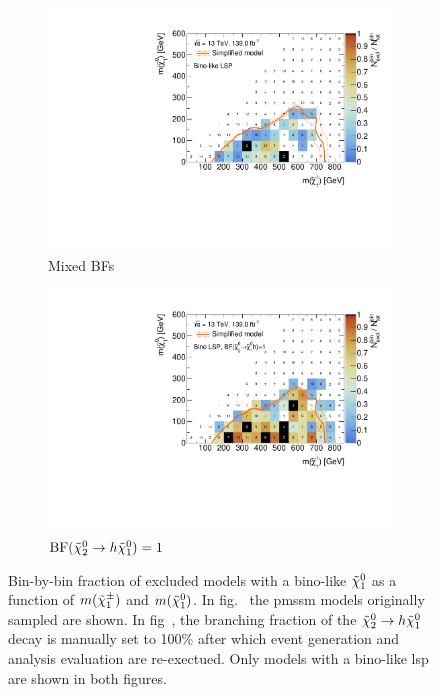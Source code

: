 \begin{figure}
	\centering
	\begin{subfigure}[b]{0.49\linewidth}
		\centering\includegraphics[width=\textwidth]{cut_bino_LSP/mchi1p_mlsp_contour}
		\caption{Mixed BFs\label{fig:mchi1p_mchi20_contour_bino_lsp_orig}}
	\end{subfigure}\hfill
	\begin{subfigure}[b]{0.49\linewidth}
		\centering\includegraphics[width=\textwidth]{cut_none_bino_LSP_Wh-only/mchi1p_mlsp_contour}
		\caption{$\mathrm{BF}(\tilde{\chi}_2^0 \rightarrow h \tilde{\chi}_1^0) = 1$\label{fig:mchi1p_mchi20_contour_bino_lsp_wh_only}}
	\end{subfigure}\hfill
	\caption{Bin-by-bin fraction of excluded models with a bino-like $\tilde{\chi}_1^0$ as a function of $m(\tilde{\chi}_1^\pm)$ and $m(\tilde{\chi}_1^0)$. In fig.~ the \gls{pmssm} models originally sampled are shown. In fig~, the branching fraction of the $\tilde{\chi}_2^0 \rightarrow h \tilde{\chi}_1^0$ decay is manually set to 100\% after which event generation and \onelepton analysis evaluation are re-exectued. Only models with a bino-like \gls{lsp} are shown in both figures.}
	\label{fig:mixed_BFs}
\end{figure}

